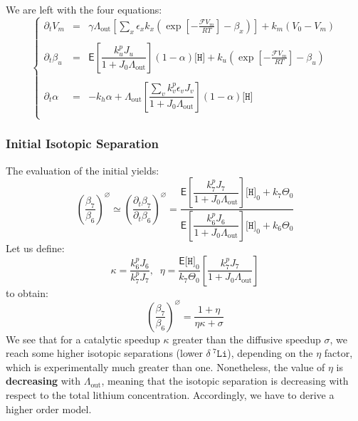 \documentclass[aps,onecolumn,11pt]{revtex4}
\newcommand{\mychem}[1]{\mathtt{#1}}
\newcommand{\myconc}[1]{\big[#1\big]}
\newcommand{\Faraday}{\mathcal{F}}
\newcommand{\spLi}[1]{{\!~^{#1}\mychem{Li}}}
\newcommand{\spproton}{\mychem{H}}
\newcommand{\proton}{\myconc{\spproton}}
\newcommand{\deltaLi}{\delta\!\!\spLi{7}}
\newcommand{\myout}[1]{{#1}_{\mathrm{out}}}
\newcommand{\LiAll}{\Lambda}
\newcommand{\LiAllOut}{\myout{\LiAll}}
\begin{document}
We are left with the four equations:
\begin{equation}
\left\lbrace
\begin{array}{rcl}
\partial_t V_m & = & \gamma\LiAllOut \left[\sum_x \epsilon_x k_x \left( \exp\left[ -\frac{\Faraday V_m}{RT}\right] -\beta_x \right)  \right] + k_m\left(V_0-V_m\right)\\
\\
\partial_t \beta_u & = & \mathsf{E} \left[\dfrac{k^p_u J_u}{1+J_0 \LiAllOut}\right] \left(1-\alpha\right) \proton
	 + k_u \left( \exp\left[-\frac{\Faraday V_m}{RT}\right] - \beta_u\right)\\
\\
\partial_t \alpha  & = &  -k_h\alpha + \LiAllOut \left[\dfrac{ \sum_v k^p_v \epsilon_v J_v}{1+J_0\LiAllOut}\right] \left(1-\alpha\right) \proton\\
\end{array}
\right.
\end{equation}

\subsubsection{Initial Isotopic Separation}
The evaluation of the initial yields:
\begin{equation}
\label{eq:level1}
	\left(\dfrac{\beta_7}{\beta_6}\right)^\varnothing \simeq \left(\dfrac{\partial_t \beta_7}{\partial_t\beta_6}\right)^\varnothing
	= \dfrac{\mathsf{E} \left[\dfrac{k^p_7 J_7}{1+J_0 \LiAllOut}\right] \proton_0 + k_7  \Theta_0
	}
	{
	\mathsf{E} \left[\dfrac{k^p_6 J_6}{1+J_0 \LiAllOut}\right] \proton_0 + k_6  \Theta_0
	}
\end{equation}
Let us define:
\begin{equation}
	\kappa = \dfrac{k^p_6 J_6}{k^p_7 J_7}, \;\; \eta = \dfrac{ \mathsf{E} \proton_0 }{ k_7  \Theta_0 } \left[\dfrac{k^p_7 J_7}{1+J_0 \LiAllOut}\right] 
\end{equation}
to obtain:
\begin{equation}
	\left(\dfrac{\beta_7}{\beta_6}\right)^\varnothing = \dfrac{1+\eta}{\eta\kappa+\sigma}
\end{equation}
We see that for a catalytic speedup $\kappa$ greater than the diffusive speedup $\sigma$, we reach some higher isotopic separations (lower $\deltaLi$), depending
on the $\eta$ factor, which is experimentally much greater than one.
Nonetheless, the value of $\eta$ is {\bf decreasing} with $\LiAllOut$, meaning that the isotopic separation is decreasing with respect to the total lithium concentration.
Accordingly, we have to derive a higher order model.
\end{document}
